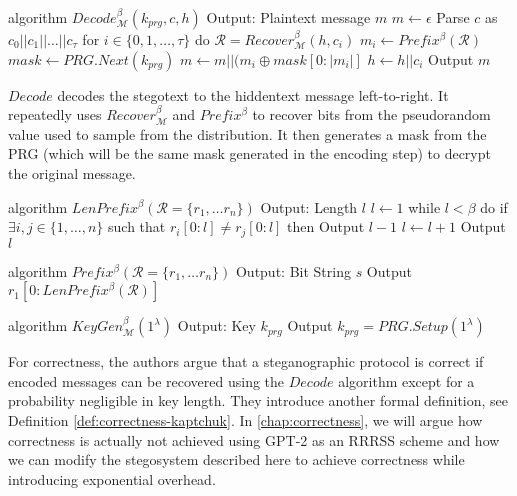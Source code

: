 \begin{Pseudocode}[float, caption={Meteor Decode Algorithm, \cite{Meteor2021}}, label={alg:decode}]
algorithm $Decode_{\mathcal{M}}^\beta(k_{prg}, c, h)$
	Output: Plaintext message $m$
	$m \leftarrow \epsilon$
	Parse $c$ as $c_0 || c_1 || \dots || c_{\tau}$
	for $i \in \{ 0, 1, \dots, \tau \}$ do
		$\mathcal{R} = Recover_{\mathcal{M}}^\beta(h, c_i)$
		$m_i \leftarrow Prefix^\beta(\mathcal{R})$
		$mask \leftarrow PRG.Next(k_{prg})$
		$m \leftarrow m || (m_i \oplus mask[0: |m_i|]$
		$h \leftarrow h||c_i$
	Output $m$
\end{Pseudocode}

$Decode$ decodes the stegotext to the hiddentext message left-to-right. 
It repeatedly uses $Recover_{\mathcal{M}}^\beta$ and $Prefix^\beta$ to recover bits from the pseudorandom value used to sample from the distribution.
It then generates a mask from the PRG (which will be the same mask generated in the encoding step) to decrypt the original message.

\begin{Pseudocode}[caption={Meteor LenPrefix Algorithm, \cite{Meteor2021}}]
algorithm $LenPrefix^\beta(\mathcal R = \{ r_1, \dots r_n \})$
	Output: Length $l$
	$l \leftarrow 1$
	while $l < \beta$ do
		if $\exists i, j \in \{ 1, \dots, n \}$ such that $r_i[0: l] \neq r_j[0:	l]$ then
			Output $l-1$
		$l \leftarrow l+1$
	Output $l$
\end{Pseudocode}%
%
\begin{Pseudocode}[caption={Meteor Prefix Algorithm, \cite{Meteor2021}}]
algorithm $Prefix^\beta(	\mathcal R = \{ r_1, \dots r_n \})$
	Output: Bit String $s$
	Output $r_1[0: LenPrefix^\beta(\mathcal{R})]$
\end{Pseudocode}%
%
\begin{Pseudocode}[caption={Meteor KeyGen Algorithm, \cite{Meteor2021}}]
algorithm $KeyGen_{\mathcal{M}}^\beta(1^\lambda)$
	Output: Key $k_{prg}$
	Output $k_{prg} = PRG.Setup(1^\lambda)$
\end{Pseudocode}

For correctness, the authors argue that a steganographic protocol is correct if encoded messages can be recovered using the $Decode$ algorithm except for a probability negligible in key length.
They introduce another formal definition, see Definition \autoref{def:correctness-kaptchuk}.
In \autoref{chap:correctness}, we will argue how correctness is actually not achieved using GPT-2 as an RRRSS scheme and how we can modify the stegosystem described here to achieve correctness while introducing exponential overhead.

